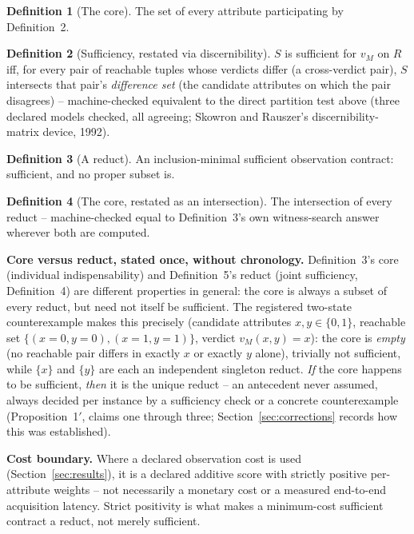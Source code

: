 \documentclass[11pt,a4paper]{article}
\theoremstyle{definition}
\newtheorem{definition}{Definition}
\begin{document}
\begin{definition}[The core]
The set of every attribute participating by Definition~2.
\end{definition}

\begin{definition}[Sufficiency, restated via discernibility]
$S$ is sufficient for $v_M$ on $R$ iff, for every pair of reachable tuples whose verdicts differ (a cross-verdict pair), $S$ intersects that pair's \emph{difference set} (the candidate attributes on which the pair disagrees) -- machine-checked equivalent to the direct partition test above (three declared models checked, all agreeing; Skowron and Rauszer's discernibility-matrix device, 1992).
\end{definition}

\begin{definition}[A reduct]
An inclusion-minimal sufficient observation contract: sufficient, and no proper subset is.
\end{definition}

\begin{definition}[The core, restated as an intersection]
The intersection of every reduct -- machine-checked equal to Definition~3's own witness-search answer wherever both are computed.
\end{definition}

\noindent\textbf{Core versus reduct, stated once, without chronology.} Definition~3's core (individual indispensability) and Definition~5's reduct (joint sufficiency, Definition~4) are different properties in general: the core is always a subset of every reduct, but need not itself be sufficient. The registered two-state counterexample makes this precisely (candidate attributes $x, y \in \{0,1\}$, reachable set $\{(x{=}0,y{=}0), (x{=}1,y{=}1)\}$, verdict $v_M(x,y) = x$): the core is \emph{empty} (no reachable pair differs in exactly $x$ or exactly $y$ alone), trivially not sufficient, while $\{x\}$ and $\{y\}$ are each an independent singleton reduct. \emph{If} the core happens to be sufficient, \emph{then} it is the unique reduct -- an antecedent never assumed, always decided per instance by a sufficiency check or a concrete counterexample (Proposition~1$'$, claims one through three; Section~\ref{sec:corrections} records how this was established).

\noindent\textbf{Cost boundary.} Where a declared observation cost is used (Section~\ref{sec:results}), it is a declared additive score with strictly positive per-attribute weights -- not necessarily a monetary cost or a measured end-to-end acquisition latency. Strict positivity is what makes a minimum-cost sufficient contract a reduct, not merely sufficient.
\end{document}
